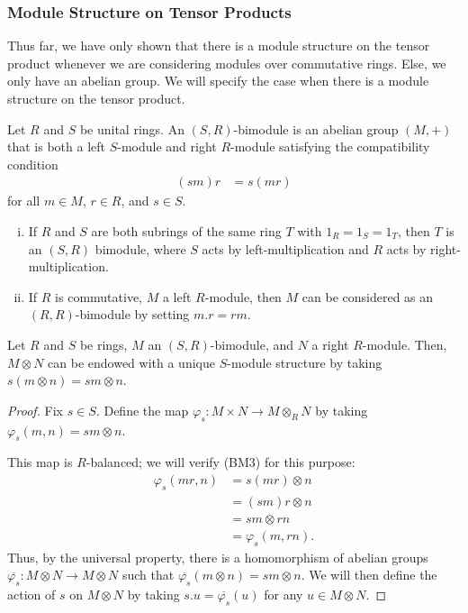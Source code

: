 \documentclass[10pt]{mypackage}
\begin{document}
\subsubsection{Module Structure on Tensor Products}%
Thus far, we have only shown that there is a module structure on the tensor product whenever we are considering modules over commutative rings. Else, we only have an abelian group. We will specify the case when there is a module structure on the tensor product.
\begin{definition}
  Let $R$ and $S$ be unital rings. An $\left( S,R \right)$-bimodule is an abelian group $\left( M,+ \right)$ that is both a left $S$-module and right $R$-module satisfying the compatibility condition
  \begin{align*}
    \left( sm \right)r &= s\left( mr \right)
  \end{align*}
  for all $m\in M$, $r\in R$, and $s\in S$.
\end{definition}
\begin{example}\hfill
  \begin{enumerate}[(i)]
    \item If $R$ and $S$ are both subrings of the same ring $T$ with $1_R = 1_S = 1_T$, then $T$ is an $\left( S,R \right)$ bimodule, where $S$ acts by left-multiplication and $R$ acts by right-multiplication.
    \item If $R$ is commutative, $M$ a left $R$-module, then $M$ can be considered as an $\left( R,R \right)$-bimodule by setting $m.r = rm$.
  \end{enumerate}
\end{example}
\begin{proposition}
  Let $R$ and $S$ be rings, $M$ an $\left( S,R \right)$-bimodule, and $N$ a right $R$-module. Then, $M\otimes N$ can be endowed with a unique $S$-module structure by taking $s\left( m\otimes n \right) = sm\otimes n$.
\end{proposition}
\begin{proof}
  Fix $s\in S$. Define the map $\varphi_s\colon M\times N\rightarrow M\otimes_{R}N$ by taking $\varphi_s\left( m,n \right) = sm\otimes n$.

  This map is $R$-balanced; we will verify (BM3) for this purpose:
  \begin{align*}
    \varphi_s\left( mr,n \right) &= s\left( mr \right)\otimes n\\
                                 &= \left( sm \right)r\otimes n\\
                                 &= sm\otimes rn\\
                                 &= \varphi_s\left( m,rn \right).
  \end{align*}
  Thus, by the universal property, there is a homomorphism of abelian groups $ \overline{\varphi_s}\colon M\otimes N\rightarrow M\otimes N $ such that $ \overline{\varphi_s}\left( m\otimes n \right) = sm\otimes n$. We will then define the action of $s$ on $M\otimes N$ by taking $s.u = \overline{\varphi_s}(u)$ for any $u\in M\otimes N$.
\end{proof}
\end{document}
